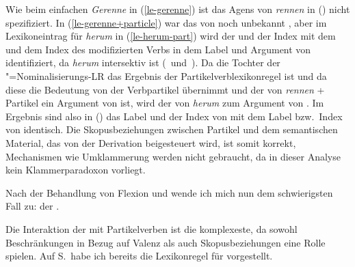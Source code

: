 \noindent
Wie beim einfachen \emph{Gerenne} in (\ref{le-gerenne}) ist das
Agens von \emph{rennen} in () nicht spezifiziert. 
In (\ref{le-gerenne+particle}) war das \argone von  noch unbekannt ,
aber im Lexikoneintrag für \emph{herum} in (\ref{le-herum-part}) wird der \ltopw und der Index mit dem \ltopw und dem Index
des modifizierten Verbs in dem Label und Argument von  identifiziert, da
\emph{herum} intersektiv ist (\, und \,). Da die Tochter der
\gee"=Nominalisierungs-LR das Ergebnis der Partikelverblexikonregel 
ist und da diese die Bedeutung von der Verbpartikel übernimmt und der \ltopw von \emph{rennen} + Partikel
ein Argument von  ist, wird der \ltopw von \emph{herum} zum Argument
von . Im Ergebnis sind also in
() das Label und der Index von  mit dem Label bzw.\ Index von  identisch.
Die Skopusbeziehungen zwischen Partikel und dem semantischen Material,
das von der Derivation beigesteuert wird, ist somit korrekt, Mechanismen
wie Umklammerung werden nicht gebraucht, da in dieser Analyse kein
Klammerparadoxon vorliegt.

\fi
{}

\noindent
Nach der Behandlung von Flexion und \geen wende ich mich nun
dem schwierigsten Fall zu: der \bard.

\label{sec-bard-pv}

Die\iw{\bars|(}%
Interaktion der \bard mit Partikelverben ist die
komplexeste, da sowohl Beschränkungen in Bezug auf Valenz
als auch Skopusbeziehungen eine Rolle spielen.
Auf S.\,\pageref{lr-bar-adj} habe ich bereits die
Lexikonregel  für \bard vorgestellt.

